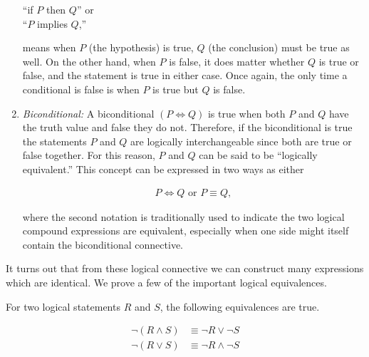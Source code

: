 \documentclass[twoside]{report}
\begin{document}
\begin{enumerate}
	\vspace{\baselineskip}
	\begin{center}
			``if $P$ then $Q$'' or \\
			``$P$ implies $Q$,''
	\end{center}
	\vspace{\baselineskip}
	
	  means when $P$ (the hypothesis) is true, $Q$ (the conclusion) must be true as well. On the other hand, when $P$ is false, it does matter whether $Q$ is true or false, and the statement is true in either case. Once again, the only time a conditional is false is when $P$ is true but $Q$ is false.
	  
	  \item \emph{Biconditional:} A biconditional $(P \iff Q)$ is true when both $P$ and $Q$ have the truth value and false they do not. Therefore, if the biconditional is true the statements $P$ and $Q$ are logically interchangeable since both are true or false together. For this reason, $P$ and $Q$ can be said to be ``logically equivalent.'' This concept can be expressed in two ways as either
	  	  
	  \begin{align*}
	  	P \iff Q \text{ or } P \equiv Q,
	  \end{align*}
	  
	  where the second notation is traditionally used to indicate the two logical compound expressions are equivalent, especially when one side might itself contain the biconditional connective.
\end{enumerate}

It turns out that from these logical connective we can construct many expressions which are identical. We prove a few of the important logical equivalences. \\

\begin{theorem}
	For two logical statements $R$ and $S$, the following equivalences are true.
	
	\begin{align}
		\neg(R \wedge S) &\equiv \neg R \lor \neg S \\
		\neg(R \lor S) &\equiv \neg R \wedge \neg S
	\end{align}
\end{theorem}
\end{document}
